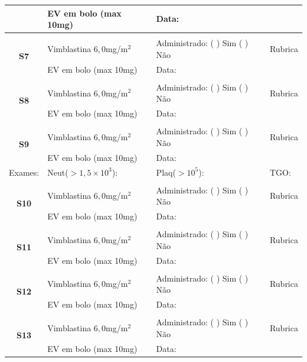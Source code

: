 \documentclass[11pt,a4paper,oldfontcommands]{memoir}
\begin{document}
\begin{center}
\begin{table}[H]
\begin{tabular}{p{}p{}|p{}|p{3cm}}
    \multicolumn{1}{c|}{}&{EV em bolo (max 10mg)}&{Data:}&\\
    \hline
    \\
    \hline
    \multicolumn{1}{c|}{\multirow{2}{*}{\textbf{S7}}}&{Vimblastina \(6,0\)mg/m\(^2\)}&{Administrado: (  ) Sim (  ) Não}&{Rubrica}\\
    \multicolumn{1}{c|}{}&{EV em bolo (max 10mg)}&{Data:}&\\
    \hline
    \\
    \hline
    \multicolumn{1}{c|}{\multirow{2}{*}{\textbf{S8}}}&{Vimblastina \(6,0\)mg/m\(^2\)}&{Administrado: (  ) Sim (  ) Não}&{Rubrica}\\
    \multicolumn{1}{c|}{}&{EV em bolo (max 10mg)}&{Data:}&\\
    \hline
    \\
    \hline
    \multicolumn{1}{c|}{\multirow{2}{*}{\textbf{S9}}}&{Vimblastina \(6,0\)mg/m\(^2\)}&{Administrado: (  ) Sim (  ) Não}&{Rubrica}\\
    \multicolumn{1}{c|}{}&{EV em bolo (max 10mg)}&{Data:}&\\
    \hline
    {Exames:}&{Neut(\(>1,5\times10^3\)):}&{Plaq(\(>10^5\)):}&{TGO:}
    \\
    \hline
    \\
    \hline
    \multicolumn{1}{c|}{\multirow{2}{*}{\textbf{S10}}}&{Vimblastina \(6,0\)mg/m\(^2\)}&{Administrado: (  ) Sim (  ) Não}&{Rubrica}\\
    \multicolumn{1}{c|}{}&{EV em bolo (max 10mg)}&{Data:}&\\
    \hline
    \\
    \hline
    \multicolumn{1}{c|}{\multirow{2}{*}{\textbf{S11}}}&{Vimblastina \(6,0\)mg/m\(^2\)}&{Administrado: (  ) Sim (  ) Não}&{Rubrica}\\
    \multicolumn{1}{c|}{}&{EV em bolo (max 10mg)}&{Data:}&\\
    \hline
    \\
    \hline
    \multicolumn{1}{c|}{\multirow{2}{*}{\textbf{S12}}}&{Vimblastina \(6,0\)mg/m\(^2\)}&{Administrado: (  ) Sim (  ) Não}&{Rubrica}\\
    \multicolumn{1}{c|}{}&{EV em bolo (max 10mg)}&{Data:}&\\
    \hline
    \\
    \hline
    \multicolumn{1}{c|}{\multirow{2}{*}{\textbf{S13}}}&{Vimblastina \(6,0\)mg/m\(^2\)}&{Administrado: (  ) Sim (  ) Não}&{Rubrica}\\
    \multicolumn{1}{c|}{}&{EV em bolo (max 10mg)}&{Data:}&\\

\end{tabular}
\end{table}
\end{center}
\end{document}
